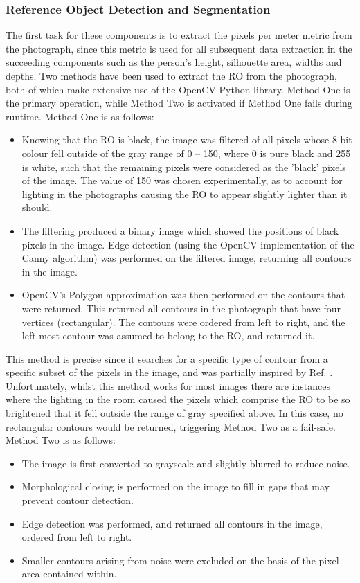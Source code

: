 \documentclass[conference]{IEEEtran}
\begin{document}
\subsubsection{Reference Object Detection and Segmentation} \label{refobdetseg}
The first task for these components is to extract the pixels per meter metric from the photograph, since this metric is used for all subsequent data extraction in the succeeding components such as the person's height, silhouette area, widths and depths.
Two methods have been used to extract the RO from the photograph, both of which make extensive use of the OpenCV-Python library.
Method One is the primary operation, while Method Two is activated if Method One fails during runtime.
Method One is as follows:
\begin{itemize}
	\item Knowing that the RO is black, the image was filtered of all pixels whose 8-bit colour fell outside of the gray range of 0 -- 150, where 0 is pure black and 255 is white, such that the remaining pixels were considered as the 'black' pixels of the image.
	The value of 150 was chosen experimentally, as to account for lighting in the photographs causing the RO to appear slightly lighter than it should.
	\item The filtering produced a binary image which showed the positions of black pixels in the image.
	Edge detection (using the OpenCV implementation of the Canny algorithm) was performed on the filtered image, returning all contours in the image.
	\item OpenCV's Polygon approximation was then performed on the contours that were returned.
	This returned all contours in the photograph that have four vertices (rectangular).
	The contours were ordered from left to right, and the left most contour was assumed to belong to the RO, and returned it.
\end{itemize}
This method is precise since it searches for a specific type of contour from a specific subset of the pixels in the image, and was partially inspired by Ref. \cite{blackShapeDetection}.
Unfortunately, whilst this method works for most images there are instances where the lighting in the room caused the pixels which comprise the RO to be so brightened that it fell outside the range of gray specified above.
In this case, no rectangular contours would be returned, triggering Method Two as a fail-safe. 
Method Two is as follows:
\begin{itemize}
	\item The image is first converted to grayscale and slightly blurred to reduce noise.
	\item Morphological closing is performed on the image to fill in gaps that may prevent contour detection.
	\item Edge detection was performed, and returned all contours in the image, ordered from left to right.
	\item Smaller contours arising from noise were excluded on the basis of the pixel area contained within.
\end{itemize}
\end{document}
